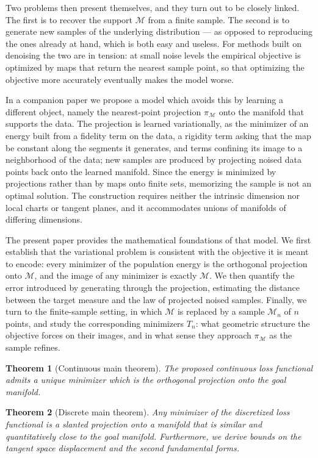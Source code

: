 \documentclass[11pt]{amsart}%
\theoremstyle{plain}
\newtheorem*{theorem*}{Theorem}
\newcommand{\1}{\mathbf{1}}
\newcommand{\M}{\mathcal{M}}
\begin{document}
Two problems then present themselves, and they turn out to be closely linked. The first is to
recover the support $\M$ from a finite sample. The second is to generate new samples of the
underlying distribution --- as opposed to reproducing the ones already at hand, which is both easy
and useless. For methods built on denoising the two are in tension: at small noise levels the
empirical objective is optimized by maps that return the nearest sample point, so that optimizing
the objective more accurately eventually makes the model worse.

In a companion paper  we propose a model which avoids this by
learning a different object, namely the nearest-point projection $\pi_\M$ onto the manifold that
supports the data. The projection is learned variationally, as the minimizer of an energy built
from a fidelity term on the data, a rigidity term asking that the map be constant along the
segments it generates, and terms confining its image to a neighborhood of the data; new samples
are produced by projecting noised data points back onto the learned manifold. Since the energy is
minimized by projections rather than by maps onto finite sets, memorizing the sample is not an
optimal solution. The construction requires neither the intrinsic dimension nor local charts or
tangent planes, and it accommodates unions of manifolds of differing dimensions.

The present paper provides the mathematical foundations of that model. We first establish that the
variational problem is consistent with the objective it is meant to encode: every minimizer of the
population energy is the orthogonal projection onto $\M$, and the image of any minimizer is exactly $\M$. We then quantify the error introduced by
generating through the projection, estimating the distance between the target measure and the law
of projected noised samples. Finally, we turn to the finite-sample setting, in which $\M$ is replaced
by a sample $\M_n$ of $n$ points, and study the corresponding minimizers $T_n$: what geometric
structure the objective forces on their images, and in what sense they approach $\pi_\M$ as the
sample refines.

\begin{theorem*}[Continuous main theorem]
    The proposed continuous loss functional admits a unique minimizer which is the orthogonal projection onto the goal manifold.
\end{theorem*}

\begin{theorem*}[Discrete main theorem]
    Any minimizer of the discretized loss functional is a slanted projection onto a manifold that is similar and quantitatively close to the goal manifold. Furthermore, we derive bounds on the tangent space displacement and the second fundamental forms.
\end{theorem*}
\end{document}
